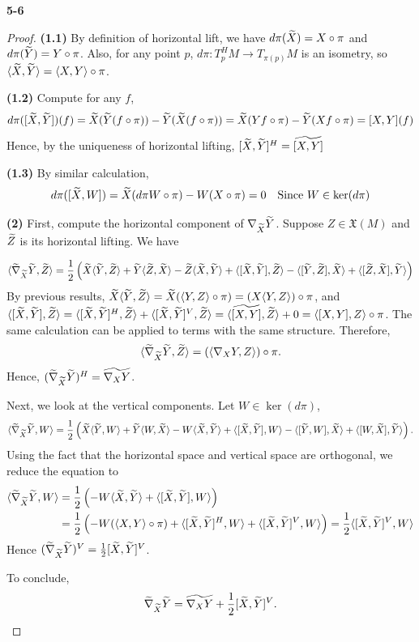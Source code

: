 \documentclass[11pt, a4paper]{article}
\theoremstyle{plain}
\theoremstyle{definition}
\theoremstyle{remark}
\begin{document}
\noindent\textbf{5-6}
\begin{proof}
    \textbf{(1.1)} By definition of horizontal lift, we have $d\pi(\widetilde{X}) = X\circ \pi$ and $d\pi(\widetilde{Y}) = Y\circ \pi$. Also, for any point $p$,
    $d\pi: T_p^H M \to T_{\pi(p)} M$ is an isometry, so $\langle \widetilde{X}, \widetilde{Y} \rangle = \langle X, Y \rangle\circ \pi$.
    
    \textbf{(1.2)} Compute for any $f$, 
    $$d\pi([\widetilde{X},\widetilde{Y}])(f) = \widetilde{X}(\widetilde{Y}(f\circ \pi)) - \widetilde{Y}(\widetilde{X}(f\circ \pi)) = \widetilde{X}(Yf\circ \pi)-\widetilde{Y}(Xf\circ\pi) = [X,Y](f)$$
    Hence, by the uniqueness of horizontal lifting, $[\widetilde{X},\widetilde{Y}]^H = \widetilde{[X,Y]}$

    \textbf{(1.3)} By similar calculation,
    \[ d\pi([\widetilde{X},W]) = \widetilde{X}(d\pi W \circ \pi) - W(X\circ \pi) = 0 \quad\text{Since }W\in\ker(d\pi)\]

    \textbf{(2)} First, compute the horizontal component of $\nabla_{\widetilde{X}} \widetilde{Y}$. Suppose $Z\in\mathfrak{X}(M)$ and $\widetilde{Z}$ is its
    horizontal lifting. We have

    \newcommand{\sbf}[4]{
\langle #1_{#2} {#3}, {#4} \rangle = \frac{1}{2}\left({#2}\langle {#3}, {#4} \rangle + {#3}\langle {#4}, {#2} \rangle - {#4}\langle {#2}, {#3} \rangle
 + \langle [{#2}, {#3}], {#4} \rangle - \langle [{#3}, {#4}], {#2} \rangle + \langle [{#4}, {#2}], {#3} \rangle\right)
    }
\[\sbf{\tba}{\tx}{\ty}{\tz}\]
By previous results, $\widetilde{X}\langle \widetilde{Y},\widetilde{Z} \rangle = \widetilde{X}(\langle Y,Z \rangle\circ \pi) = (X\langle Y,Z \rangle)\circ \pi$, and
$\langle [\widetilde{X},\widetilde{Y}],\widetilde{Z} \rangle = \langle [\widetilde{X},\widetilde{Y}]^H,\widetilde{Z} \rangle + \langle [\widetilde{X},\widetilde{Y}]^V,\widetilde{Z} \rangle = \langle \widetilde{[X,Y]},\widetilde{Z} \rangle + 0 = \langle [X,Y],Z \rangle\circ\pi$. The same calculation
can be applied to terms with the same structure. Therefore,
\[\langle \widetilde{\nabla}_{\widetilde{X}}\widetilde{Y},\widetilde{Z} \rangle = \left(\langle \nabla_X Y,Z \rangle\right)\circ \pi.\]
Hence, $(\widetilde{\nabla}_{\widetilde{X}}\widetilde{Y})^H = \widetilde{\nabla_X Y}$.

Next, we look at the vertical components. Let $W\in\ker(d\pi)$,
\[\sbf{\tba}{\tx}{\ty}{W}.\]
Using the fact that the horizontal space and vertical space are orthogonal, we reduce the equation to
\begin{align*}
    \langle \widetilde{\nabla}_{\widetilde{X}}\widetilde{Y},W \rangle &= \frac{1}{2}\left(-W\langle \widetilde{X},\widetilde{Y} \rangle + \langle [\widetilde{X},\widetilde{Y}],W \rangle\right)\\
    &=\frac{1}{2}\left(-W(\langle X,Y \rangle\circ \pi) + \langle [\widetilde{X},\widetilde{Y}]^H,W \rangle +\langle [\widetilde{X},\widetilde{Y}]^V,W \rangle  \right) = \frac{1}{2}\langle [\widetilde{X},\widetilde{Y}]^V,W \rangle
\end{align*}
Hence $(\widetilde{\nabla}_{\widetilde{X}}\widetilde{Y})^V = \frac{1}{2}[\widetilde{X},\widetilde{Y}]^V$.

To conclude,
\[\widetilde{\nabla}_{\widetilde{X}}\widetilde{Y} = \widetilde{\nabla_X Y}+ \frac{1}{2}[\widetilde{X},\widetilde{Y}]^V.\]
\end{proof}
\end{document}
